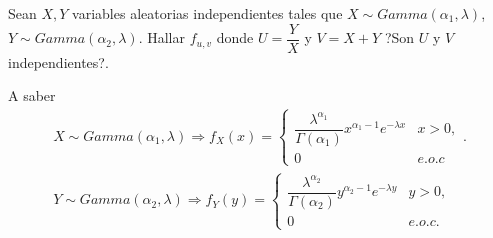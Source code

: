\begin{Ejem}
Sean $X,Y$ variables aleatorias independientes tales que $X \sim Gamma \left( \alpha _{1},\lambda\right)$, $Y \sim Gamma \left( \alpha_{2}, \lambda \right)$. Hallar $f_{u,v}$ donde $ U= \dfrac{Y}{X}$ y $V = X+Y$ ?Son $U$ y $V$ independientes?.


A saber
\begin{eqnarray*}
X\sim Gamma \left( \alpha _{1},\lambda \right)\Rightarrow f_{X} \left(x \right)=
\begin{cases}
\dfrac{\lambda^{\alpha_{1}} }{\Gamma \left(\alpha_{1}\right)} x^{\alpha_{1}-1}e^{-\lambda x} & x>0, \\ 
0 & e.o.c
\end{cases}.\\
Y\sim Gamma \left( \alpha _{2},\lambda \right)\Rightarrow f_{Y} \left(y \right)=
\begin{cases}
\dfrac{\lambda^{\alpha_{2}} }{\Gamma \left(\alpha_{2}\right)} y^{\alpha_{2}-1}e^{-\lambda y} & y>0, \\ 
0 & e.o.c.
\end{cases}
\end{eqnarray*}


\end{Ejem}
